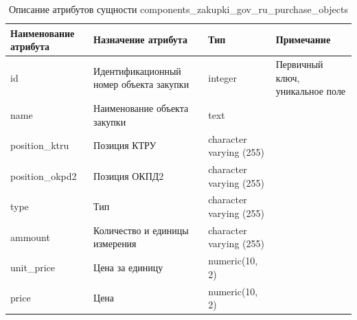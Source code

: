\documentclass{mirea}
\begin{document}
	\begin{longtable}{ |p{}|p{}|p{}|p{}| } 
		\caption{Описание атрибутов сущности components\_zakupki\-\_gov\-\_ru\-\_purchase\-\_objects}
		\endfirsthead
		\endhead
		\hline
		Наименование атрибута & Назначение атрибута & Тип & Примечание \\ \hline
		
		id & Идентификацион\-ный номер объекта закупки & integer & Первичный ключ, уникальное поле \\ \hline
		
		name & Наименование объекта закупки & text & \\ \hline
		
		position\_ktru & Позиция КТРУ & character varying (255) &  \\ \hline
		
		position\_okpd2 & Позиция ОКПД2 & character varying (255) &  \\ \hline
		
		type & Тип & character varying (255) &  \\ \hline
		
	 	ammount & Количество и единицы измерения & character varying (255) &  \\ \hline
	 	
	 	unit\_price & Цена за единицу & numeric(10, 2) &  \\ \hline
	 	
	 	price & Цена & numeric(10, 2) &  \\ \hline
		
	\end{longtable}
\end{document}

